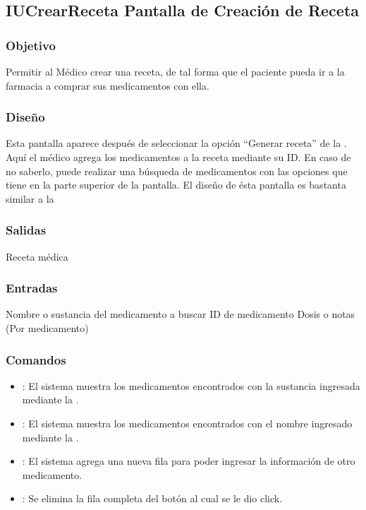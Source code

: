 \subsection{IUCrearReceta Pantalla de Creaci\'on de Receta}

\subsubsection{Objetivo}
	Permitir al M\'edico crear una receta, de tal forma que el paciente pueda ir a la farmacia a comprar sus medicamentos con ella.

\subsubsection{Diseño}
	Esta pantalla aparece despu\'es de seleccionar la opci\'on "`Generar receta"' de la \label{IUMedico}. Aqu\'i el m\'edico agrega los medicamentos a la receta mediante su ID. En caso de no saberlo, puede realizar una b\'usqueda de medicamentos con las opciones que tiene en la parte superior de la pantalla. El diseño de \'esta pantalla es bastanta similar a la \label{IUCompra}


\subsubsection{Salidas}

	Receta m\'edica

\subsubsection{Entradas}
Nombre o sustancia del medicamento a buscar
ID de medicamento
Dosis o notas (Por medicamento)

\subsubsection{Comandos}
\begin{itemize}
		\item {}: El sistema muestra los medicamentos encontrados con la sustancia ingresada mediante la \label{IUResultados}.
		\item {}: El sistema muestra los medicamentos encontrados con el nombre ingresado mediante la \label{IUResultados}.
		\item {}: El sistema agrega una nueva fila para poder ingresar la informaci\'on de otro medicamento.
		\item {}: Se elimina la fila completa del bot\'on al cual se le dio click.
\end{itemize}


